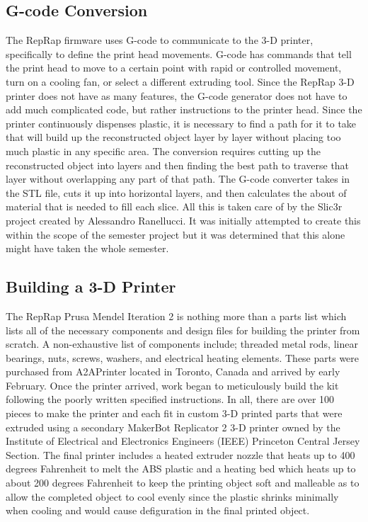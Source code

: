 \documentclass[pdftex,10.5pt]{report}
\begin{document}
\subsection{G-code Conversion}
The RepRap firmware uses G-code to communicate to the 3-D printer, specifically to define the print head movements. G-code has commands that tell the print head to move to a certain point with rapid or controlled movement, turn on a cooling fan, or select a different extruding tool. Since the RepRap 3-D printer does not have as many features, the G-code generator does not have to add much complicated code, but rather instructions to the printer head. Since the printer continuously dispenses plastic, it is necessary to find a path for it to take that will build up the reconstructed object layer by layer without placing too much plastic in any specific area. The conversion requires cutting up the reconstructed object into layers and then finding the best path to traverse that layer without overlapping any part of that path. The G-code converter takes in the STL file, cuts it up into horizontal layers, and then calculates the about of material that is needed to fill each slice. All this is taken care of by the Slic3r project created by Alessandro Ranellucci. \cite{slic3r} It was initially attempted to create this within the scope of the semester project but it was determined that this alone might have taken the whole semester. 

\subsection{Building a 3-D Printer}
The RepRap Prusa Mendel Iteration 2 is nothing more than a parts list which lists all of the necessary components and design files for building the printer from scratch. A non-exhaustive list of components include; threaded metal rods, linear bearings, nuts, screws, washers, and electrical heating elements. \cite{reprap} These parts were purchased from A2APrinter located in Toronto, Canada and arrived by early February. Once the printer arrived, work began to meticulously build the kit following the poorly written specified instructions. In all, there are over 100 pieces to make the printer and each fit in custom 3-D printed parts that were extruded using a secondary MakerBot Replicator 2 3-D printer owned by the  Institute of Electrical and Electronics Engineers (IEEE) Princeton Central Jersey Section. The final printer includes a heated extruder nozzle that heats up to 400 degrees Fahrenheit to melt the ABS plastic and a heating bed which heats up to about 200 degrees Fahrenheit to keep the printing object soft and malleable as to allow the completed object to cool evenly since the plastic shrinks minimally when cooling and would cause defiguration in the final printed object.
\end{document}
